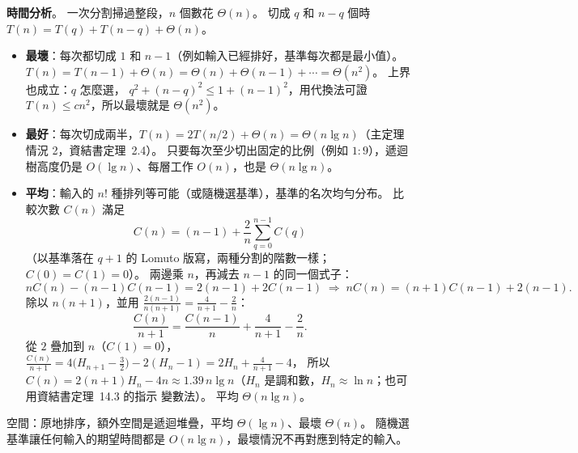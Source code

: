 \begin{pastsoln}
\textbf{時間分析}。 一次分割掃過整段，$n$ 個數花 $\Theta(n)$。 切成 $q$ 和 $n - q$ 個時
$T(n) = T(q) + T(n - q) + \Theta(n)$。
\begin{itemize}
\item \textbf{最壞}：每次都切成 $1$ 和 $n - 1$（例如輸入已經排好，基準每次都是最小值）。
$T(n) = T(n-1) + \Theta(n) = \Theta(n) + \Theta(n-1) + \cdots = \Theta(n^2)$。 上界也成立：$q$ 怎麼選，
$q^2 + (n-q)^2 \le 1 + (n-1)^2$，用代換法可證 $T(n) \le cn^2$，所以最壞就是 $\Theta(n^2)$。
\item \textbf{最好}：每次切成兩半，$T(n) = 2T(n/2) + \Theta(n) = \Theta(n \lg n)$（主定理情況 2，資結書定理~2.4）。
只要每次至少切出固定的比例（例如 $1:9$），遞迴樹高度仍是 $O(\lg n)$、每層工作 $O(n)$，也是 $\Theta(n \lg n)$。
\item \textbf{平均}：輸入的 $n!$ 種排列等可能（或隨機選基準），基準的名次均勻分布。 比較次數 $C(n)$ 滿足
\[
C(n) = (n - 1) + \frac{2}{n}\sum_{q=0}^{n-1} C(q)
\]
（以基準落在 $q + 1$ 的 Lomuto 版寫，兩種分割的階數一樣；$C(0) = C(1) = 0$）。 兩邊乘 $n$，再減去 $n - 1$
的同一個式子：
\[
nC(n) - (n-1)C(n-1) = 2(n-1) + 2C(n-1) \;\Longrightarrow\; nC(n) = (n+1)C(n-1) + 2(n-1).
\]
除以 $n(n+1)$，並用 $\frac{2(n-1)}{n(n+1)} = \frac{4}{n+1} - \frac{2}{n}$：
\[
\frac{C(n)}{n+1} = \frac{C(n-1)}{n} + \frac{4}{n+1} - \frac{2}{n}.
\]
從 $2$ 疊加到 $n$（$C(1) = 0$），$\frac{C(n)}{n+1} = 4\bigl(H_{n+1} - \frac{3}{2}\bigr) - 2(H_n - 1) = 2H_n + \frac{4}{n+1} - 4$，
所以 $C(n) = 2(n+1)H_n - 4n \approx 1.39\, n \lg n$（$H_n$ 是調和數，$H_n \approx \ln n$；也可用資結書定理~14.3 的指示
變數法）。 平均 $\Theta(n \lg n)$。
\end{itemize}
空間：原地排序，額外空間是遞迴堆疊，平均 $\Theta(\lg n)$、最壞 $\Theta(n)$。 隨機選基準讓任何輸入的期望時間都是
$O(n \lg n)$，最壞情況不再對應到特定的輸入。
\end{pastsoln}

